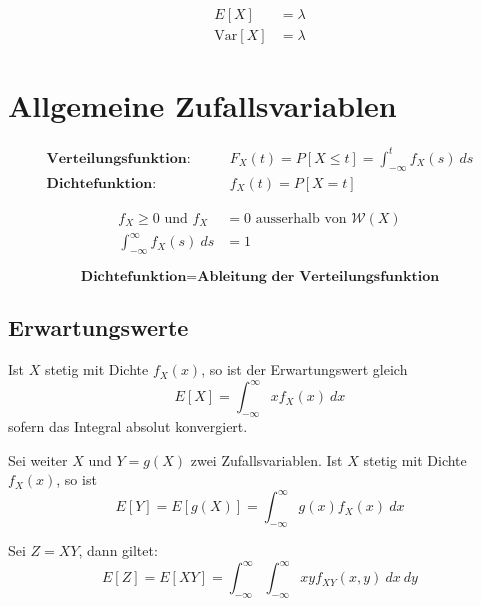 \documentclass[11pt]{article}
\newcommand{\Var}{\text{Var}}
\begin{document}
\begin{equation*}
\begin{split}
	E[X] & = \lambda \\
	\Var[X] & = \lambda
\end{split}
\end{equation*}

\section{Allgemeine Zufallsvariablen}

\begin{equation*}
\begin{split}
	\textbf{Verteilungsfunktion:}&\qquad F_X(t) = P[X \leq t] = \int_{-\infty}^t f_X(s)\ ds \\
	\textbf{Dichtefunktion:}&\qquad f_X(t) = P[X = t]
\end{split}
\end{equation*}

\begin{equation*}
\begin{split}
	f_X \geq 0 \text{ und } f_X & = 0\text{ ausserhalb von } \mathcal{W}(X) \\
	\int_{-\infty}^\infty f_X(s)\ ds & = 1
\end{split}
\end{equation*}

\begin{equation*}
	\textbf{Dichtefunktion} = \textbf{Ableitung der Verteilungsfunktion}
\end{equation*}

\subsection{Erwartungswerte}

Ist $X$ stetig mit Dichte $f_X(x)$, so ist der Erwartungswert gleich
\begin{equation*}
	E[X] = \int_{-\infty}^\infty x f_X(x)\ dx
\end{equation*}
sofern das Integral absolut konvergiert.

Sei weiter $X$ und $Y = g(X)$ zwei Zufallsvariablen. Ist $X$ stetig mit Dichte $f_X(x)$, so ist
\begin{equation*}
	E[Y] = E[g(X)] = \int_{-\infty}^\infty g(x)f_X(x)\ dx
\end{equation*} 

Sei $Z = XY$, dann giltet:
\begin{equation*}
	E[Z] = E[XY] = \int_{-\infty}^\infty \int_{-\infty}^\infty x y f_{XY}(x, y)\ dx\ dy
\end{equation*}
\end{document}
